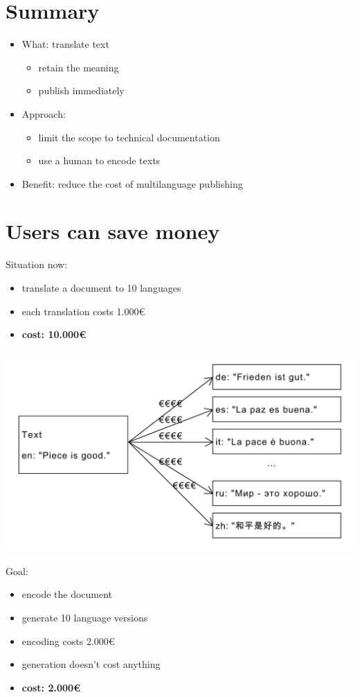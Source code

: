 \documentclass{article}
\begin{document}
\section{Summary}
\begin{itemize}
\item What: translate text
  \begin{itemize}
  \item retain the meaning
  \item publish immediately
  \end{itemize}
\item Approach:
  \begin{itemize}
  \item limit the scope to technical documentation
  \item use a human to encode texts
  \end{itemize}
\item Benefit: reduce the cost of multilanguage publishing
\end{itemize}

\section{Users can save money}

Situation now:
\begin{itemize}
\item translate a document to 10 languages
\item each translation costs 1.000€
\item \textbf{cost: 10.000€}
\end{itemize}

\includegraphics[scale=0.4]{dia/user-view-current-world.pdf}

Goal:
\begin{itemize}
\item encode the document
\item generate 10 language versions
\item encoding costs 2.000€
\item generation doesn't cost anything
\item \textbf{cost: 2.000€}
\end{itemize}
\end{document}
